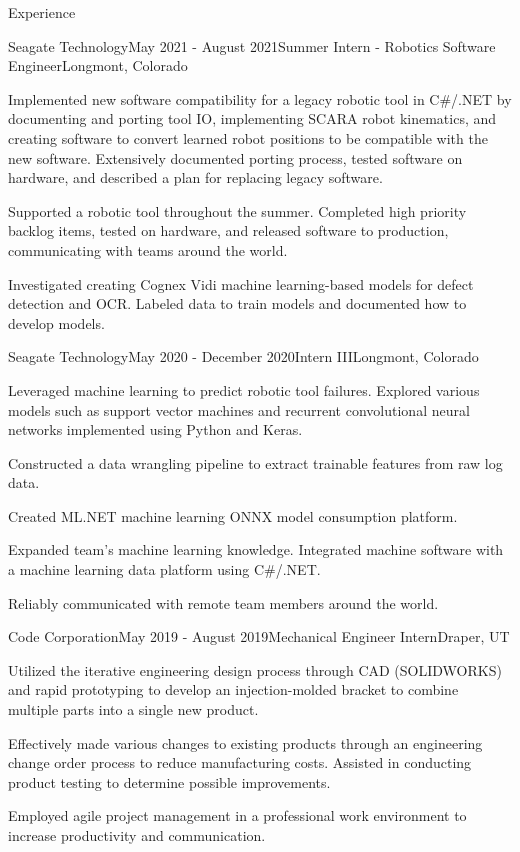 \documentclass{resume}
\begin{document}
\begin{rSection}{Experience}
    \begin{rSubsection}{Seagate Technology}{May 2021 - August 2021}{Summer Intern - Robotics Software Engineer}{Longmont, Colorado}
    \item Implemented new software compatibility for a legacy robotic tool in  C\#/.NET by documenting and porting tool IO, implementing SCARA robot kinematics, and creating software to convert learned robot positions to be compatible with the new software. 
    Extensively documented porting process, tested software on hardware, and described a plan for replacing legacy software.
    \item Supported a robotic tool throughout the summer. Completed high priority backlog items, tested on hardware, and released software to production, communicating with teams around the world.
    \item Investigated creating Cognex Vidi machine learning-based models for defect detection and OCR. Labeled data to train models and documented how to develop models.
    \end{rSubsection}
  
    \begin{rSubsection}{Seagate Technology}{May 2020 - December 2020}{Intern III}{Longmont, Colorado}
    \item Leveraged machine learning to predict robotic tool failures. 
    Explored various models such as support vector machines and recurrent convolutional neural networks implemented using Python and Keras. 
    \item Constructed a data wrangling pipeline to extract trainable features from raw log data. 
    \item Created ML.NET machine learning ONNX model consumption platform.
    \item Expanded team’s machine learning knowledge. Integrated machine software with a machine learning data platform using C\#/.NET.
    \item Reliably communicated with remote team members around the world.
    \end{rSubsection}

    \begin{rSubsection}{Code Corporation}{May 2019 - August 2019}{Mechanical Engineer Intern}{Draper, UT}
    \item Utilized the iterative engineering design process through CAD (SOLIDWORKS) and rapid prototyping to develop an injection-molded bracket to combine multiple parts into a single new product.  
    \item Effectively made various changes to existing products through an engineering change order process to reduce manufacturing costs.  Assisted in conducting product testing to determine possible improvements.  
    \item Employed agile project management in a professional work environment to increase productivity and communication.
    \end{rSubsection}
 
  \end{rSection}
\end{document}
